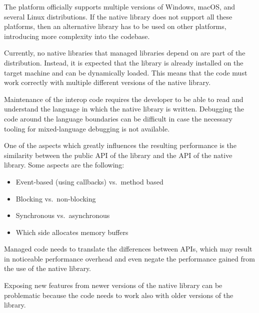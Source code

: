 \begin{itemize}

   The \dotnet{} platform officially supports
    multiple versions of Windows, macOS, and several Linux distributions. If the native library does
    not support all these platforms, then an alternative library has to be used on other platforms,
    introducing more complexity into the codebase.

   Currently, no native libraries that managed
    \dotnet{} libraries depend on are part of the \dotnet{} distribution. Instead, it is expected
    that the library is already installed on the target machine and can be dynamically loaded. This
    means that the \dotnet{} code must work correctly with multiple different versions of the native
    library.

   Maintenance of the interop code requires the developer to be able to
    read and understand the language in which the native library is written. Debugging the code
    around the language boundaries can be difficult in case the necessary tooling for mixed-language
    debugging is not available.

   One of the aspects which greatly influences the resulting performance is
    the similarity between the public API of the \dotnet{} library and the API of the native
    library. Some aspects are the following:

    \begin{itemize}
      \item Event-based (using callbacks) vs.\ method based
      \item Blocking vs.\ non-blocking
      \item Synchronous vs.\ asynchronous
      \item Which side allocates memory buffers
    \end{itemize}

    Managed code needs to translate the differences between APIs, which may result in noticeable
    performance overhead and even negate the performance gained from the use of the native library.

   

   Exposing new features from newer versions of the native library can
    be problematic because the code needs to work also with older versions of the library.

\end{itemize}

